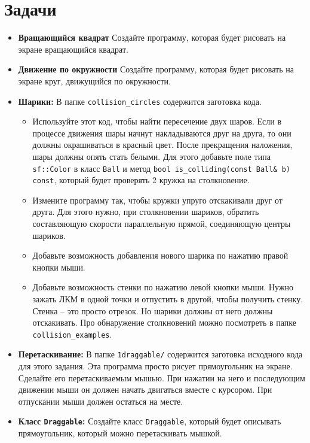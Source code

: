 \documentclass{article}
\begin{document}
\newpage
\section{Задачи}
\begin{itemize}


\item \textbf{Вращающийся квадрат}
Создайте программу, которая будет рисовать на экране вращающийся квадрат.


\item \textbf{Движение по окружности}
Создайте программу, которая будет рисовать на экране круг, движущийся по окружности.

\item \textbf{Шарики:} В папке \texttt{collision\_circles} содержится заготовка кода. 
\begin{itemize}
\item Используйте этот код, чтобы найти пересечение двух шаров. Если в процессе движения шары начнут накладываются друг на друга, то они должны окрашиваться в красный цвет. После прекращения наложения, шары должны опять стать белыми. Для этого добавьте поле типа \texttt{sf::Color} в класс \texttt{Ball} и метод \texttt{bool is\_colliding(const Ball\& b) const}, который будет проверять 2 кружка на столкновение.
\item Измените программу так, чтобы кружки упруго отскакивали друг от друга. Для этого нужно, при столкновении шариков, обратить составляющую скорости параллельную прямой, соединяющую центры шариков.
\item Добавьте возможность добавления нового шарика по нажатию правой кнопки мыши.
\item Добавьте возможность стенки по нажатию левой кнопки мыши. Нужно зажать ЛКМ в одной точки и отпустить в другой, чтобы получить стенку. Стенка -- это просто отрезок. Но шарики должны от него должны отскакивать. Про обнаружение столкновений можно посмотреть в папке \texttt{collision\_examples}.
\end{itemize}


\item \textbf{Перетаскивание:} В папке \texttt{1draggable/} содержится заготовка исходного кода для этого задания. Эта программа просто рисует прямоугольник на экране. Сделайте его перетаскиваемым мышью. При нажатии на него и последующим движении мыши он должен начать двигаться вместе с курсором. При отпускании мыши должен остаться на месте.

\item \textbf{Класс \texttt{Draggable}:} Создайте класс \texttt{Draggable}, который будет описывать прямоугольник, который можно перетаскивать мышкой.



\end{itemize}
\end{document}
